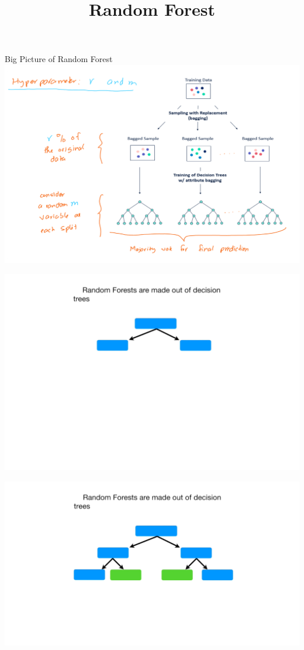 \documentclass[
  ignorenonframetext,
]{beamer}
\title{Random Forest}
\author{}
\date{\vspace{-2.5em}}
\begin{document}
\frame{\titlepage}

\begin{frame}{Big Picture of Random Forest}
\protect\hypertarget{big-picture-of-random-forest}{}
\includegraphics{images/rf1.png}
\end{frame}

\begin{frame}{}
\protect\hypertarget{section}{}
\includegraphics{images/r1.png}
\end{frame}

\begin{frame}{}
\protect\hypertarget{section-1}{}
\includegraphics{images/r2.png}
\end{frame}
\end{document}
